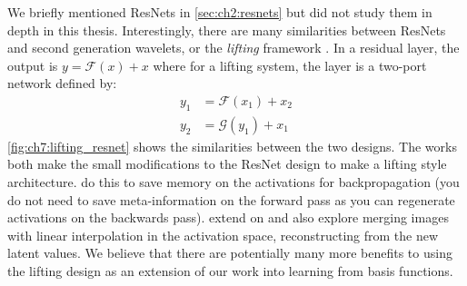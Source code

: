 We briefly mentioned ResNets in \autoref{sec:ch2:resnets} but did not study them
in depth in this thesis. Interestingly, there are many similarities between
ResNets and second generation wavelets, or the \emph{lifting} framework
\cite{sweldens_lifting_1998,daubechies_factoring_1998}.
In a residual layer, the output is $y = \mathcal{F}(x) + x$ where for a lifting
system, the layer is a two-port network defined by:
\begin{align}
  y_1 &= \mathcal{F}(x_1) + x_2 \\
  y_2 &= \mathcal{G}(y_1) + x_1
\end{align}
\autoref{fig:ch7:lifting_resnet} shows the similarities between the two designs.
The works \cite{gomez_reversible_2017, jacobsen_i-revnet:_2018} both make the small modifications
to the ResNet design to make a lifting style architecture.
\citeauthor{gomez_reversible_2017} \cite{gomez_reversible_2017} do this to save
memory on the activations for backpropagation (you do not need to save
meta-information on the forward pass as you can regenerate activations on the
backwards pass).
\citeauthor{jacobsen_i-revnet:_2018} \cite{jacobsen_i-revnet:_2018} extend on
\cite{gomez_reversible_2017} and also explore merging images with linear
interpolation in the activation space, reconstructing from the new latent
values. We believe that there are potentially many more benefits to using the
lifting design as an extension of our work into learning from basis functions.
\begin{figure}
  \centering
  \qquad
  \label{fig:ch7:lifting_resnet}
\end{figure}

